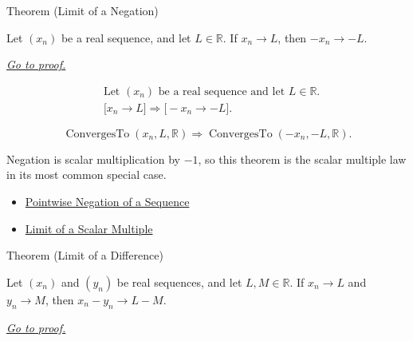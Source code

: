 \begin{theorembox}{Theorem (Limit of a Negation)}
\begin{theorem}
\label{thm:limit-of-a-negation}
Let $(x_n)$ be a real sequence, and let $L\in\mathbb{R}$. If $x_n\to L$,
then $-x_n\to -L$.

\smallskip
\noindent
\hyperref[prf:limit-of-a-negation]{\textit{Go to proof.}}
\end{theorem}
\end{theorembox}

\begin{remark*}
\[
\begin{aligned}
&\text{Let } (x_n) \text{ be a real sequence and let } L\in\mathbb{R}.\\
&\bigl[x_n\to L\bigr]
\Longrightarrow
\bigl[-x_n\to -L\bigr].
\end{aligned}
\]
\end{remark*}

\begin{remark*}
\[
\operatorname{ConvergesTo}(x_n,L,\mathbb{R})
\Longrightarrow
\operatorname{ConvergesTo}(-x_n,-L,\mathbb{R}).
\]
\end{remark*}

\begin{remark*}[Interpretation]
Negation is scalar multiplication by $-1$, so this theorem is the scalar
multiple law in its most common special case.
\end{remark*}

\begin{dependencies}
\begin{itemize}
  \item \hyperref[def:pointwise-negation-sequence]{Pointwise Negation of a Sequence}
  \item \hyperref[thm:limit-of-scalar-multiple]{Limit of a Scalar Multiple}
\end{itemize}
\end{dependencies}


\begin{theorembox}{Theorem (Limit of a Difference)}
\begin{theorem}
\label{thm:limit-of-a-difference}
Let $(x_n)$ and $(y_n)$ be real sequences, and let $L,M\in\mathbb{R}$.
If $x_n\to L$ and $y_n\to M$, then $x_n-y_n\to L-M$.

\smallskip
\noindent
\hyperref[prf:limit-of-a-difference]{\textit{Go to proof.}}
\end{theorem}
\end{theorembox}

